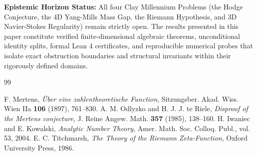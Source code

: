 \documentclass[11pt,a4paper]{article}
\theoremstyle{definition}
\begin{document}
\vspace{0.5em}
\noindent\textbf{Epistemic Horizon Status:} All four Clay Millennium Problems (the Hodge Conjecture, the 4D Yang-Mills Mass Gap, the Riemann Hypothesis, and 3D Navier-Stokes Regularity) remain strictly open. The results presented in this paper constitute verified finite-dimensional algebraic theorems, unconditional identity splits, formal Lean 4 certificates, and reproducible numerical probes that isolate exact obstruction boundaries and structural invariants within their rigorously defined domains.

\begin{thebibliography}{99}

 F. Mertens, \emph{\"Uber eine zahlentheoretische Function}, Sitzungsber. Akad. Wiss. Wien IIa \textbf{106} (1897), 761--830.
 A. M. Odlyzko and H. J. J. te Riele, \emph{Disproof of the Mertens conjecture}, J. Reine Angew. Math. \textbf{357} (1985), 138--160.
 H. Iwaniec and E. Kowalski, \emph{Analytic Number Theory}, Amer. Math. Soc. Colloq. Publ., vol. 53, 2004.
 E. C. Titchmarsh, \emph{The Theory of the Riemann Zeta-Function}, Oxford University Press, 1986.

\end{thebibliography}
\end{document}
